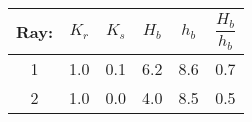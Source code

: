 \begin{tabular}{cccccc}
Ray: & $K_{r}$ & $K_{s}$ & $H_{b}$ & $h_{b}$ & $\dfrac{H_{b}}{h_{b}}$ \\
\hline
1 & 1.0 & 0.1 & 6.2 & 8.6 & 0.7 \\
2 & 1.0 & 0.0 & 4.0 & 8.5 & 0.5 \\
\hline
\end{tabular}
